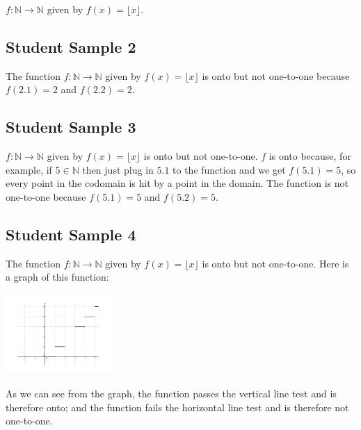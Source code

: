 \documentclass[11pt,letterpaper]{article}
\begin{document}
$f:\mathbb{N} \rightarrow \mathbb{N}$ given by $f(x) = \lfloor x \rfloor$. 



\subsection*{Student Sample 2} %
\label{sub:student_sample_2}

The function $f:\mathbb{N} \rightarrow \mathbb{N}$ given by $f(x) = \lfloor x \rfloor$ is onto but not one-to-one because $f(2.1) = 2$ and $f(2.2) = 2$. 



\subsection*{Student Sample 3} %
\label{sub:student_sample_3}

$f:\mathbb{N} \rightarrow \mathbb{N}$ given by $f(x) = \lfloor x \rfloor$ is onto but not one-to-one. $f$ is onto because, for example, if $5 \in \mathbb{N}$ then just plug in $5.1$ to the function and we get $f(5.1) = 5$, so every point in the codomain is hit by a point in the domain. The function is not one-to-one because $f(5.1) = 5$ and $f(5.2) = 5$. 


\subsection*{Student Sample 4} %
\label{sub:student_sample_4}

The function $f:\mathbb{N} \rightarrow \mathbb{N}$ given by $f(x) = \lfloor x \rfloor$ is onto but not one-to-one. Here is a graph of this function: 
\begin{center}
	\includegraphics[width=0.3\textwidth]{sample1floor}
\end{center}
As we can see from the graph, the function passes the vertical line test and is therefore onto; and the function fails the horizontal line test and is therefore not one-to-one. 
\end{document}
